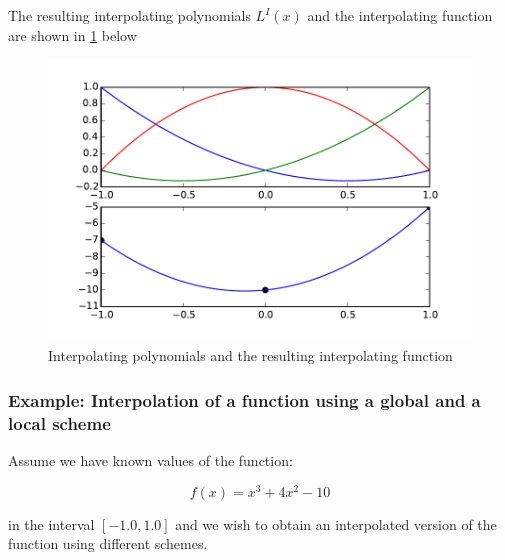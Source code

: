 The resulting interpolating polynomials $L^I(x)$ and the interpolating function  are shown in \cref{fig:pols} below
\begin{figure}[H]
  \centering
  \includegraphics[width=16cm]{func.pdf}
  \caption{Interpolating polynomials and the resulting interpolating function}
  \label{fig:pols}
\end{figure}

\subsubsection*{Example: Interpolation of a function using a global and a local scheme}
Assume we have known values of the function:

\[f(x) = {x^3} + 4{x^2} - 10\]

in the interval $[-1.0, 1.0]$ and we wish to obtain an interpolated version of the function using different schemes.



